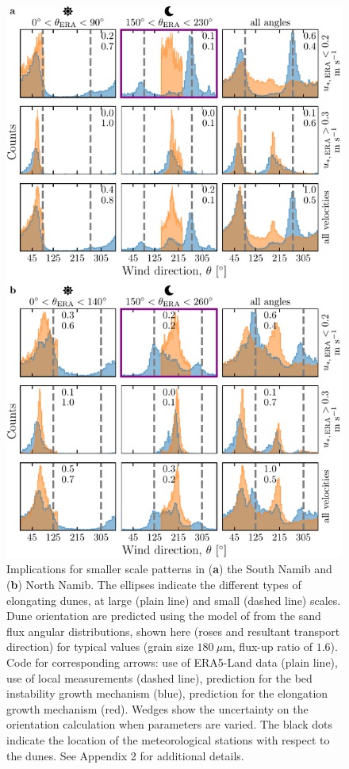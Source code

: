 \begin{figure}
\centering
\includegraphics[scale=1]{Figures/Figure6.pdf}
\caption{Implications for smaller scale patterns in (\textbf{a}) the South Namib and (\textbf{b}) North Namib. The ellipses indicate the different types of elongating dunes, at large (plain line) and small (dashed line) scales. Dune orientation are predicted using the model of \citet{Courrech2014} from the sand flux angular distributions, shown here (roses and resultant transport direction) for typical values (grain size $180~\mu$m, flux-up ratio of $1.6$). Code for corresponding arrows: use of ERA5-Land data (plain line), use of local measurements (dashed line), prediction for the bed instability growth mechanism (blue), prediction for the elongation growth mechanism (red). Wedges show the uncertainty on the orientation calculation when parameters are varied. The black dots indicate the location of the meteorological stations with respect to the dunes. See Appendix 2 for additional details.}
\label{Fig6}
\end{figure}


